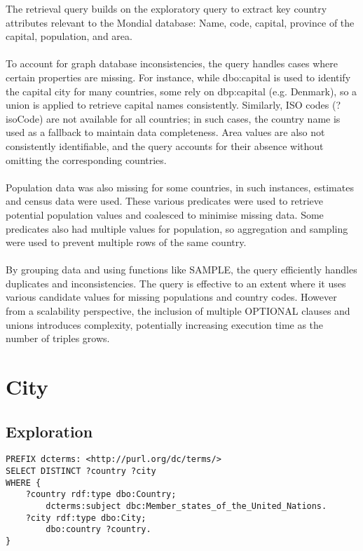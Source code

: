 \documentclass[11pt]{article}
\begin{document}
The retrieval query builds on the exploratory query to extract key country attributes relevant to the Mondial database: Name, code, capital,
province of the capital, population, and area. 
\\ \\
To account for graph database inconsistencies, the query handles cases where certain properties are missing. For instance, while dbo:capital is used
to identify the capital city for many countries, some rely on dbp:capital (e.g. Denmark), so a union is applied to retrieve capital names
consistently. Similarly, ISO codes (?isoCode) are not available for all countries; in such cases, the country name is used as a fallback to
maintain data completeness. Area values are also not consistently identifiable, and the query accounts for their absence without omitting the
corresponding countries.
\\ \\
Population data was also missing for some countries, in such instances, estimates and census data were used. These various predicates were
used to retrieve potential population values and coalesced to minimise missing data. Some predicates also had multiple values for population,
so aggregation and sampling were used to prevent multiple rows of the same country. 
\\ \\
By grouping data and using functions like SAMPLE, the query efficiently handles duplicates and inconsistencies. The query is effective to an extent
where it uses various candidate values for missing populations and country codes. However from a scalability perspective, the inclusion of multiple
OPTIONAL clauses and unions introduces complexity, potentially increasing execution time as the number of triples grows. 

\section{City}

\subsection{Exploration}
{\footnotesize\begin{verbatim}
PREFIX dcterms: <http://purl.org/dc/terms/>
SELECT DISTINCT ?country ?city
WHERE {
    ?country rdf:type dbo:Country;
        dcterms:subject dbc:Member_states_of_the_United_Nations.
    ?city rdf:type dbo:City;
        dbo:country ?country.
}
\end{verbatim}}
\end{document}
